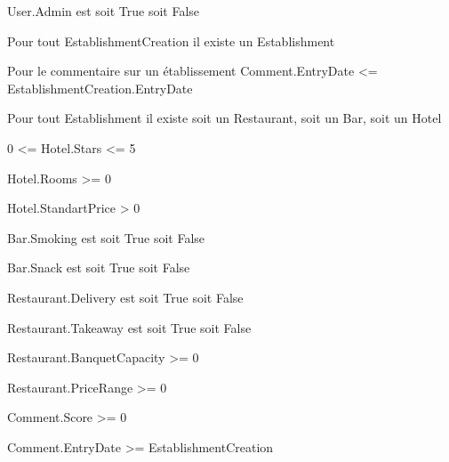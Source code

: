 \documentclass[11pt,a4paper]{report}
\begin{document}
\pagebreak
User.Admin est soit True soit False

Pour tout EstablishmentCreation il existe un Establishment

Pour le commentaire sur un établissement Comment.EntryDate <= EstablishmentCreation.EntryDate

Pour tout Establishment il existe soit un Restaurant, soit un Bar, soit un Hotel

0 <= Hotel.Stars <= 5

Hotel.Rooms >= 0

Hotel.StandartPrice > 0

Bar.Smoking est soit True soit False

Bar.Snack est soit True soit False

Restaurant.Delivery est soit True soit False

Restaurant.Takeaway est soit True soit False

Restaurant.BanquetCapacity >= 0

Restaurant.PriceRange >= 0

Comment.Score >= 0

Comment.EntryDate >= EstablishmentCreation 
\end{document}
